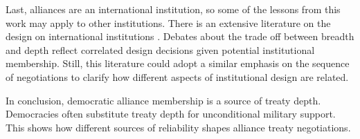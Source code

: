 \documentclass[12pt]{article}
\begin{document}
Last, alliances are an international institution, so some of the lessons from this work may apply to other institutions. 
There is an extensive literature on the design on international institutions \citep{DownesRocke1995, MartinSimmons1998, Koremenosetal2001, Koremenos2005, Thompson2010}.
Debates about the trade off between breadth and depth \citep{Downsetal1998, Gilligan2004} reflect correlated design decisions given potential institutional membership. 
Still, this literature could adopt a similar emphasis on the sequence of negotiations to clarify how different aspects of institutional design are related. 


In conclusion, democratic alliance membership is a source of treaty depth. 
Democracies often substitute treaty depth for unconditional military support. 
This shows how different sources of reliability shapes alliance treaty negotiations. 



\singlespace
 
 
\end{document}
